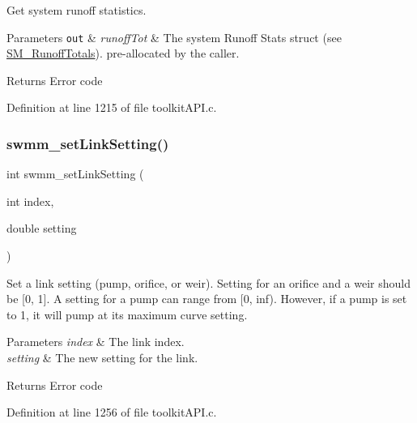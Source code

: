 Get system runoff statistics. 


\begin{DoxyParams}[1]{Parameters}
\mbox{\tt out}  & {\em runoff\+Tot} & The system Runoff Stats struct (see \hyperlink{struct_s_m___runoff_totals}{S\+M\+\_\+\+Runoff\+Totals}). pre-\/allocated by the caller. \\
\hline
\end{DoxyParams}
\begin{DoxyReturn}{Returns}
Error code 
\end{DoxyReturn}


Definition at line 1215 of file toolkit\+A\+P\+I.\+c.

\mbox{\label{group__tkfuncs_gab44d2b1c21a6f750b0ce4c48ba16be81}} 
\subsubsection{\texorpdfstring{swmm\+\_\+set\+Link\+Setting()}{swmm\_setLinkSetting()}}
{\footnotesize\ttfamily int swmm\+\_\+set\+Link\+Setting (\begin{DoxyParamCaption}\item[{int}]{index,  }\item[{double}]{setting }\end{DoxyParamCaption})}



Set a link setting (pump, orifice, or weir). Setting for an orifice and a weir should be \mbox{[}0, 1\mbox{]}. A setting for a pump can range from \mbox{[}0, inf). However, if a pump is set to 1, it will pump at its maximum curve setting. 


\begin{DoxyParams}{Parameters}
{\em index} & The link index. \\
\hline
{\em setting} & The new setting for the link. \\
\hline
\end{DoxyParams}
\begin{DoxyReturn}{Returns}
Error code 
\end{DoxyReturn}


Definition at line 1256 of file toolkit\+A\+P\+I.\+c.

\mbox{\label{group__tkfuncs_ga6438a8a45d7712b8b02ba630cd8e1db3}} 
